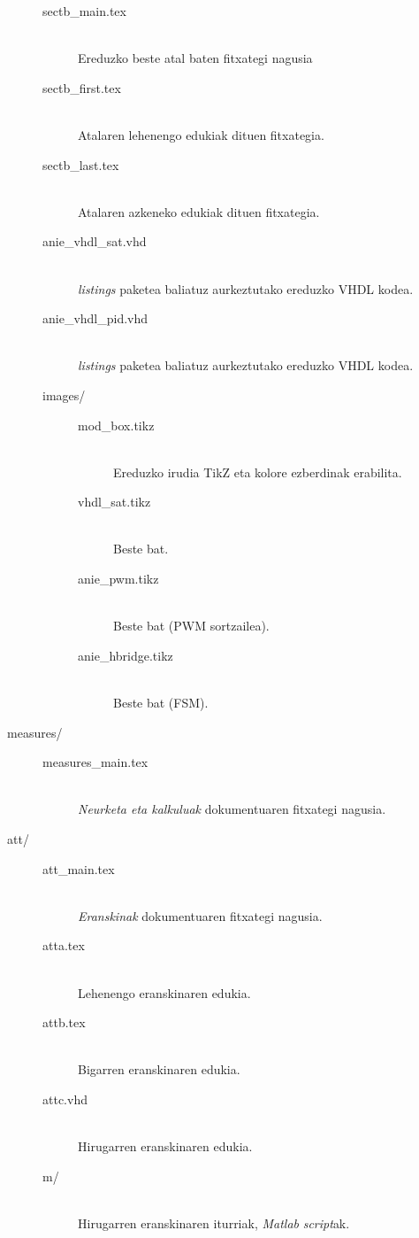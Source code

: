 \begin{description}
{  \begin{description}
   \item[sectb\_main.tex]{\hfill\\Ereduzko beste atal baten fitxategi nagusia}
   \item[sectb\_first.tex]{\hfill\\Atalaren lehenengo edukiak dituen fitxategia.}
   \item[sectb\_last.tex]{\hfill\\Atalaren azkeneko edukiak dituen fitxategia.}
   \item[anie\_vhdl\_sat.vhd]{\hfill\\\emph{listings} paketea baliatuz aurkeztutako ereduzko VHDL kodea.}
   \item[anie\_vhdl\_pid.vhd]{\hfill\\\emph{listings} paketea baliatuz aurkeztutako ereduzko VHDL kodea.}
   \item[images/]{\hfill
   
    \begin{description}
     \item[mod\_box.tikz]{\hfill\\Ereduzko irudia TikZ eta kolore ezberdinak erabilita.}
     \item[vhdl\_sat.tikz]{\hfill\\Beste bat.}
     \item[anie\_pwm.tikz]{\hfill\\Beste bat (PWM sortzailea).}
     \item[anie\_hbridge.tikz]{\hfill\\Beste bat (FSM).}
    \end{description}   
   }
  \end{description} 
 }
 \item[measures/]{\hfill
 
  \begin{description}
   \item[measures\_main.tex]{\hfill\\\emph{Neurketa eta kalkuluak} dokumentuaren fitxategi nagusia.}
  \end{description} 
 }
 \item[att/]{\hfill

  \begin{description}
   \item[att\_main.tex]{\hfill\\\emph{Eranskinak} dokumentuaren fitxategi nagusia.}
   \item[atta.tex]{\hfill\\Lehenengo eranskinaren edukia.}
   \item[attb.tex]{\hfill\\Bigarren eranskinaren edukia.}
   \item[attc.vhd]{\hfill\\Hirugarren eranskinaren edukia.}
   \item[m/]{\hfill\\Hirugarren eranskinaren iturriak, \emph{Matlab} \emph{script}ak.\hfill
   
}
\end{description}}
\end{description}
